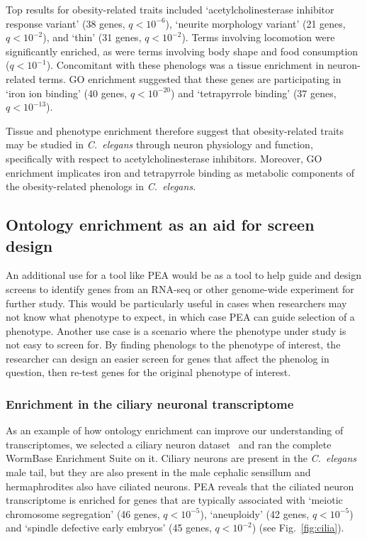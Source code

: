 \documentclass[10pt,letterpaper,twocolumn]{article}
\newcommand{\cel}{\emph{C.~elegans}}
\newcommand{\qval}[1]{\ensuremath{q<10^{-#1}}}
\begin{document}
Top results for obesity-related traits included `acetylcholinesterase inhibitor
response variant' (38 genes, \qval{6}),
`neurite morphology variant' (21 genes, \qval{2}),
and `thin' (31 genes, \qval{2}).
Terms involving locomotion were significantly enriched, as were terms involving
body shape and food consumption (\qval{1}). Concomitant with these phenologs was
a tissue enrichment in neuron-related terms. GO enrichment suggested that these
genes are participating in `iron ion binding' (40 genes, \qval{20}) and
`tetrapyrrole binding' (37 genes, \qval{13}).

Tissue and phenotype enrichment therefore suggest that obesity-related traits
may be studied in \cel{} through neuron physiology and function, specifically
with respect to acetylcholinesterase inhibitors. Moreover, GO enrichment
implicates iron and tetrapyrrole binding as metabolic components of
the obesity-related phenologs in \cel{}.

\subsection*{Ontology enrichment as an aid for screen design}
An additional use for a tool like PEA would be as a tool to help guide and
design screens to identify genes from an RNA-seq or other genome-wide experiment
for further study. This would be particularly useful in cases when researchers
may not know what phenotype to expect, in which case PEA can guide selection of
a phenotype. Another use case is a scenario where the phenotype under study is
not easy to screen for. By finding phenologs to the phenotype of interest, the
researcher can design an easier screen for genes that affect the phenolog in
question, then re-test genes for the original phenotype of interest.

\subsubsection*{Enrichment in the ciliary neuronal transcriptome}
As an example of how ontology enrichment can improve our understanding of
transcriptomes,
we selected a ciliary neuron dataset~\cite{Wang2015} and ran the complete WormBase
Enrichment Suite on it. Ciliary neurons are present in the \cel{} male tail, but
they are also present in the male cephalic sensillum and hermaphrodites also have
ciliated neurons. PEA reveals that the ciliated
neuron transcriptome is enriched for genes that are typically associated with
`meiotic chromosome segregation' (46 genes, \qval{5}),
`aneuploidy' (42 genes, \qval{5}) and `spindle defective early embryos' (45
genes, \qval{2}) (see Fig.~\ref{fig:cilia}).
\end{document}
